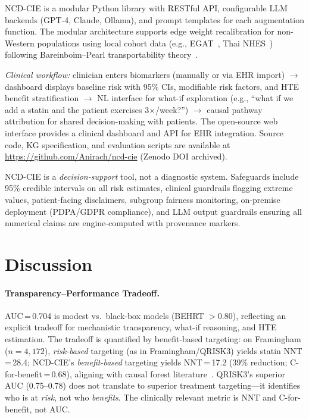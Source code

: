 \documentclass[runningheads]{llncs}
\begin{document}
NCD-CIE is a modular Python library with RESTful API, configurable
LLM backends (GPT-4, Claude, Ollama), and prompt templates for each
augmentation function.
The modular architecture supports edge weight recalibration for
non-Western populations using local cohort data (e.g.,
EGAT~\cite{sritara2003egat}, Thai NHES~\cite{aekplakorn2011thai})
following Bareinboim--Pearl transportability
theory~\cite{bareinboim2016causal}.

\emph{Clinical workflow:} clinician enters biomarkers (manually or
via EHR import) $\to$ dashboard displays baseline risk with 95\%
CIs, modifiable risk factors, and HTE benefit stratification $\to$
NL interface for what-if exploration (e.g., ``what if we add a
statin and the patient exercises 3$\times$/week?'') $\to$ causal
pathway attribution for shared decision-making with patients.
The open-source web interface provides a clinical dashboard and API
for EHR integration.
Source code, KG specification, and evaluation scripts are available
at \url{https://github.com/Anirach/ncd-cie} (Zenodo DOI archived).

NCD-CIE is a \emph{decision-support} tool, not a diagnostic system.
Safeguards include 95\% credible intervals on all risk estimates,
clinical guardrails flagging extreme values, patient-facing
disclaimers, subgroup fairness monitoring, on-premise deployment
(PDPA/GDPR compliance), and LLM output guardrails ensuring all
numerical claims are engine-computed with provenance markers.

\section{Discussion}\label{sec:discussion}

\paragraph{Transparency--Performance Tradeoff.}
AUC\,=\,0.704 is modest vs.\ black-box models (BEHRT $>$0.80),
reflecting an explicit tradeoff for mechanistic transparency,
what-if reasoning, and HTE estimation.
The tradeoff is quantified by benefit-based targeting: on
Framingham ($n = 4{,}172$), \emph{risk-based} targeting (as in
Framingham/QRISK3) yields
statin NNT\,=\,28.4; NCD-CIE's \emph{benefit-based} targeting
yields NNT\,=\,17.2 (39\% reduction; C-for-benefit\,=\,0.68),
aligning with causal forest
literature~\cite{inoue2023causalforest,nakamura2025statin}.
QRISK3's superior AUC (0.75--0.78) does not translate to superior
treatment targeting---it identifies who is at \emph{risk}, not who
\emph{benefits}.
The clinically relevant metric is NNT and C-for-benefit, not AUC.
\end{document}
